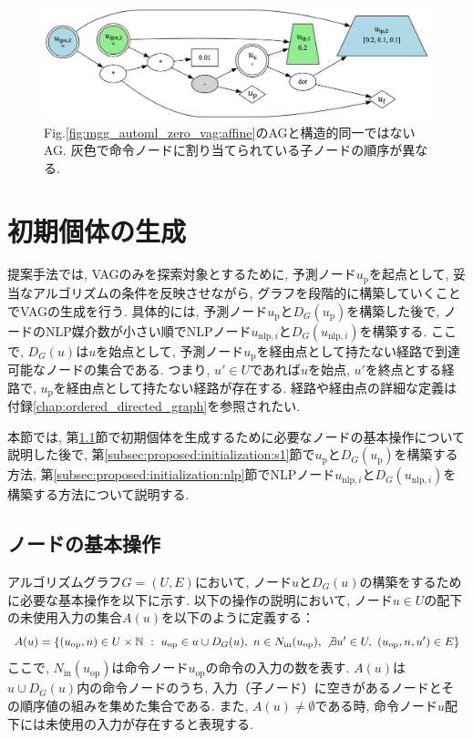 \documentclass[11pt,oneside,openany,report]{jsbook}
\begin{document}
\begin{figure}
  \centering
  \includegraphics[width=14cm]{mgg_automl_zero_vag/ag/neq2.png}
  \caption{Fig.\ref{fig:mgg_automl_zero_vag:affine}のAGと構造的同一ではないAG. 灰色で命令ノードに割り当てられている子ノードの順序が異なる.}
  \label{fig:mgg_automl_zero_vag:neq2}
\end{figure}

\section{初期個体の生成}\label{sec:proposed:initialization}

提案手法では, VAGのみを探索対象とするために, 予測ノード$u_\mathrm{p}$を起点として, 妥当なアルゴリズムの条件を反映させながら, グラフを段階的に構築していくことでVAGの生成を行う. 具体的には, 予測ノード$u_\mathrm{p}$と$D_G(u_\mathrm{p})$を構築した後で, ノードのNLP媒介数が小さい順でNLPノード$u_{\mathrm{nlp},i}$と$D_G(u_{\mathrm{nlp},i})$を構築する. ここで, $D_G(u)$は$u$を始点として, 予測ノード$u_\mathrm{p}$を経由点として持たない経路で到達可能なノードの集合である. つまり, $u' \in U$であれば$u$を始点, $u'$を終点とする経路で, $u_\mathrm{p}$を経由点として持たない経路が存在する. 経路や経由点の詳細な定義は付録\ref{chap:ordered_directed_graph}を参照されたい.

本節では, 第\ref{subsec:proposed:initialization:basic_operation}節で初期個体を生成するために必要なノードの基本操作について説明した後で, 第\ref{subsec:proposed:initialization:s1}節で$u_\mathrm{p}$と$D_G(u_\mathrm{p})$を構築する方法, 第\ref{subsec:proposed:initialization:nlp}節でNLPノード$u_{\mathrm{nlp},i}$と$D_G(u_{\mathrm{nlp},i})$を構築する方法について説明する.

\subsection{ノードの基本操作} \label{subsec:proposed:initialization:basic_operation}

アルゴリズムグラフ$G=(U, E)$において, ノード$u$と$D_G(u)$の構築をするために必要な基本操作を以下に示す. 以下の操作の説明において, ノード$u \in U$の配下の未使用入力の集合$A(u)$を以下のように定義する：
$$
A(u) = \{ (u_\mathrm{op}, n) \in U \times \mathbb{N} \ :\ u_\mathrm{op} \in u \cup D_G(u),\ n \in N_\mathrm{in}(u_\mathrm{op}),\ \not\exists u' \in U,\ (u_\mathrm{op}, n, u') \in E \}
$$
\noindent
ここで, $N_\mathrm{in}(u_\mathrm{op})$は命令ノード$u_\mathrm{op}$の命令の入力の数を表す. $A(u)$は$u \cup D_G(u)$内の命令ノードのうち, 入力（子ノード）に空きがあるノードとその順序値の組みを集めた集合である. また, $A(u) \neq \emptyset$である時, 命令ノード$u$配下には未使用の入力が存在すると表現する.
\end{document}

